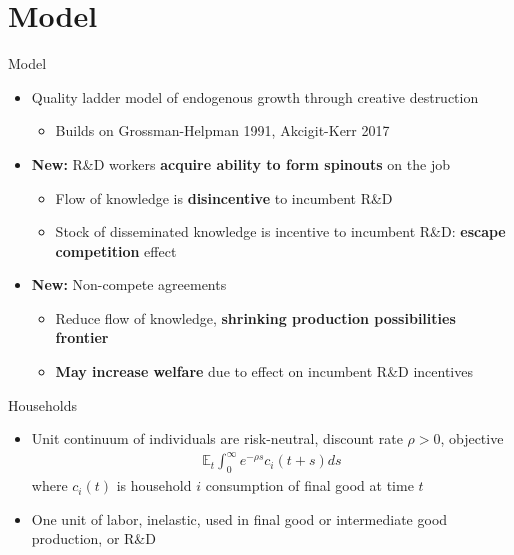 \documentclass[english,usenames,dvipsnames]{beamer}
\begin{document}
\section{Model}

\begin{frame}
\tableofcontents[currentsection]
\end{frame}

\begin{frame}{Model}
\begin{itemize}	
\item Quality ladder model of endogenous growth through creative destruction 
\begin{itemize}
	\item Builds on Grossman-Helpman 1991, Akcigit-Kerr 2017 
\end{itemize}
\item \alert{\textbf{New:}} R\&D workers \textbf{\alert{acquire ability to form spinouts}} on the job
\begin{itemize}
	\item Flow of knowledge is \textbf{\alert{disincentive}} to incumbent R\&D
	\item Stock of disseminated knowledge is incentive to incumbent R\&D: \textbf{\alert{escape competition}} effect
\end{itemize} 
\item \alert{\textbf{New:}} Non-compete agreements
\begin{itemize}
	\item Reduce flow of knowledge, \textbf{\alert{shrinking production possibilities frontier}}
	\item \textbf{\alert{May increase welfare}} due to effect on incumbent R\&D incentives
\end{itemize}
\end{itemize}
\end{frame}


\begin{frame}{Households}
\begin{itemize}
\item Unit continuum of individuals are risk-neutral, discount rate $\rho > 0$, objective
\begin{align*}
\mathbb{E}_t \int_0^{\infty} e^{-\rho s} c_i(t+s) ds
\end{align*}
where $c_i(t)$ is household $i$ consumption of final good at time $t$
\item One unit of labor, inelastic, used in final good or intermediate good production, or R\&D
\end{itemize}
\end{frame}
\end{document}
